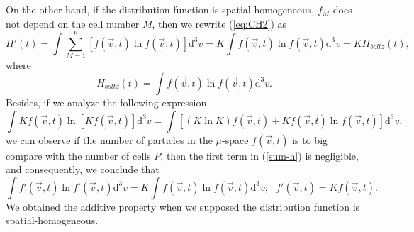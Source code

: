 On the other hand, if the distribution function is spatial-homogeneous, $f_M$ does not depend on the cell number $M$, then we rewrite (\ref{eq:CH2}) as
%
\begin{equation}
    H'(t)=\int \sum_{M=1}^{K} [f(\vec{v},t)\ln f(\vec{v},t)] \mathrm{d}^{3}v
         = K\int  f(\vec{v},t) \ln f(\vec{v},t) \mathrm{d}^{3}v= K H_{boltz}(t), 
\end{equation}
%
where
%
\begin{equation}
    H_{boltz}(t)=\int f(\vec{v},t) \ln f(\vec{v},t) \mathrm{d}^{3}v.
\end{equation}
%
Besides, if we analyze the following expression
%
\begin{equation}
    \int Kf(\vec{v},t) \ln [Kf(\vec{v},t)] \mathrm{d}^{3}v = \int [(K\ln K)f(\vec{v},t) + Kf(\vec{v},t) \ln f(\vec{v},t)]\mathrm{d}^{3}v, \label{sum-h}
\end{equation}
%
we can observe if the number of particles in the $\mu$-space $f(\vec{v},t)$ is to big compare with the number of cells $P$, then the first term in (\ref{sum-h}) is negligible, and consequently, we conclude that
%
\begin{equation}
    \int f'(\vec{v},t) \ln f'(\vec{v},t) \mathrm{d}^{3}v = K\int f(\vec{v},t) \ln f(\vec{v},t) \mathrm{d}^{3}v; \ \ \ f'(\vec{v},t)= Kf(\vec{v},t). \label{aditive-property} 
\end{equation}
%
We obtained the additive property when we supposed the distribution function is
spatial-homogeneous.


